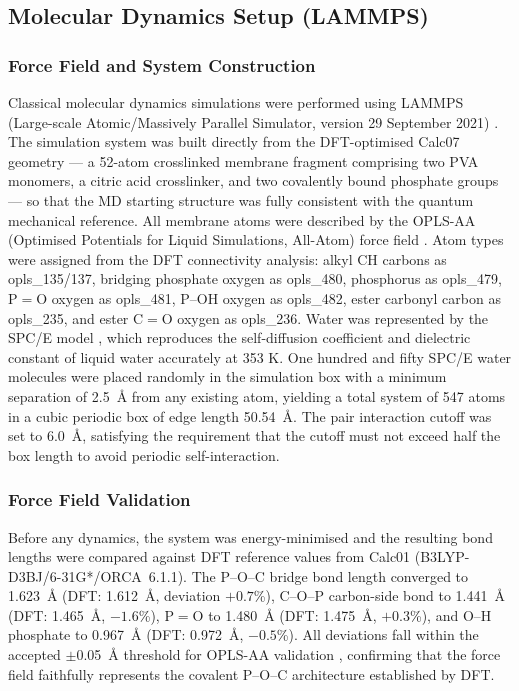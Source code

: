 \documentclass[12pt,a4paper]{report}
\begin{document}
\subsection{Molecular Dynamics Setup (LAMMPS)}

\subsubsection{Force Field and System Construction}

Classical molecular dynamics simulations were performed using LAMMPS 
(Large-scale Atomic/Massively Parallel Simulator, version 29 September 
2021) \cite{104}. The simulation system was built directly 
from the DFT-optimised Calc07 geometry --- a 52-atom crosslinked 
membrane fragment comprising two PVA monomers, a citric acid 
crosslinker, and two covalently bound phosphate groups --- so that 
the MD starting structure was fully consistent with the quantum 
mechanical reference. All membrane atoms were described by the 
OPLS-AA (Optimised Potentials for Liquid Simulations, All-Atom) force 
field \cite{95}. Atom types were assigned from the DFT 
connectivity analysis: alkyl CH carbons as opls\_135/137, bridging 
phosphate oxygen as opls\_480, phosphorus as opls\_479, P\(=\)O oxygen 
as opls\_481, P--OH oxygen as opls\_482, ester carbonyl carbon as 
opls\_235, and ester C\(=\)O oxygen as opls\_236. Water was represented 
by the SPC/E model \cite{107}, which reproduces the 
self-diffusion coefficient and dielectric constant of liquid water 
accurately at 353 K. One hundred and fifty SPC/E water molecules were 
placed randomly in the simulation box with a minimum separation of 
2.5~\AA{} from any existing atom, yielding a total system of 547 atoms 
in a cubic periodic box of edge length 50.54~\AA{}. The pair 
interaction cutoff was set to 6.0~\AA{}, satisfying the requirement 
that the cutoff must not exceed half the box length to avoid periodic 
self-interaction.

\subsubsection{Force Field Validation}

Before any dynamics, the system was energy-minimised and the resulting 
bond lengths were compared against DFT reference values from Calc01 
(B3LYP-D3BJ/6-31G*/ORCA~6.1.1). The P--O--C bridge bond length 
converged to 1.623~\AA{} (DFT: 1.612~\AA{}, deviation $+0.7$\%), 
C--O--P carbon-side bond to 1.441~\AA{} (DFT: 1.465~\AA{}, 
$-1.6$\%), P\(=\)O to 1.480~\AA{} (DFT: 1.475~\AA{}, $+0.3$\%), 
and O--H phosphate to 0.967~\AA{} (DFT: 0.972~\AA{}, $-0.5$\%). 
All deviations fall within the accepted \(\pm\)0.05~\AA{} threshold 
for OPLS-AA validation \cite{95}, confirming that the 
force field faithfully represents the covalent P--O--C architecture 
established by DFT.
\end{document}
